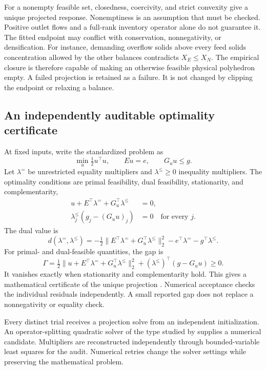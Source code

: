 For a nonempty feasible set, closedness, coercivity, and strict convexity give a unique projected response. Nonemptiness is an assumption that must be checked. Positive outlet flows and a full-rank inventory operator alone do not guarantee it. The fitted endpoint may conflict with conservation, nonnegativity, or densification. For instance, demanding overflow solids above every feed solids concentration allowed by the other balances contradicts $X_E\le X_N$. The empirical closure is therefore capable of making an otherwise feasible physical polyhedron empty. A failed projection is retained as a failure. It is not changed by clipping the endpoint or relaxing a balance.

\subsection{An independently auditable optimality certificate}

At fixed inputs, write the standardized problem as
\begin{equation}
\min_u\tfrac12u^\top u,\qquad Eu=e,\qquad G_uu\le g.
\label{eq:plant_standard_projection}
\end{equation}
Let $\lambda^=$ be unrestricted equality multipliers and $\lambda^\le\ge0$ inequality multipliers. The optimality conditions are primal feasibility, dual feasibility, stationarity, and complementarity,
\begin{align}
u+E^\top\lambda^=+G_u^\top\lambda^\le&=0,\\
\lambda^\le_j(g_j-(G_uu)_j)&=0\quad\text{for every }j.
\label{eq:plant_projection_optimality}
\end{align}
The dual value is
\begin{equation}
d(\lambda^=,\lambda^\le)=
-\tfrac12\|E^\top\lambda^=+G_u^\top\lambda^\le\|_2^2
-e^\top\lambda^=-g^\top\lambda^\le.
\end{equation}
For primal- and dual-feasible quantities, the gap is
\begin{equation}
\Gamma=\tfrac12\|u+E^\top\lambda^=+G_u^\top\lambda^\le\|_2^2
+(\lambda^\le)^\top(g-G_uu)\ge0.
\label{eq:plant_projection_gap}
\end{equation}
It vanishes exactly when stationarity and complementarity hold. This gives a mathematical certificate of the unique projection \citep{Boyd2004}. Numerical acceptance checks the individual residuals independently. A small reported gap does not replace a nonnegativity or equality check.

Every distinct trial receives a projection solve from an independent initialization. An operator-splitting quadratic solver of the type studied by \citet{Stellato2020} supplies a numerical candidate. Multipliers are reconstructed independently through bounded-variable least squares for the audit. Numerical retries change the solver settings while preserving the mathematical problem.


